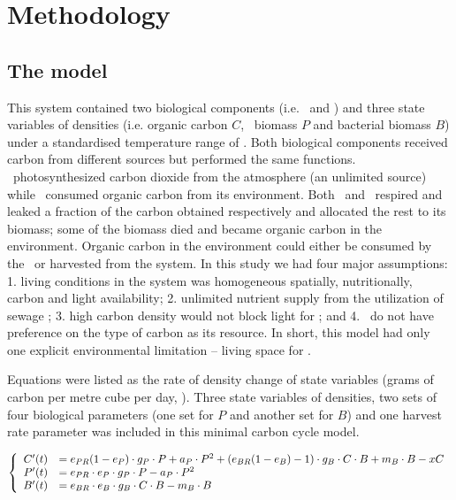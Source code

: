 \documentclass[../thesis.tex]{subfiles} %
\begin{document}
\section{Methodology}

\subsection{The model}

This system contained two biological components (i.e. \phy\ and \bac) and three state variables of densities (i.e. organic carbon $C$, \phy\ biomass $P$ and bacterial biomass $B$) under a standardised temperature range of \temp.  Both biological components received carbon from different sources but performed the same functions. \Phy\ photosynthesized carbon dioxide from the atmosphere (an unlimited source) while \bac\ consumed organic carbon from its environment.  Both \phy\ and \bac\ respired and leaked a fraction of the carbon obtained respectively and allocated the rest to its biomass; some of the biomass died and became organic carbon in the environment.  Organic carbon in the environment could either be consumed by the \bac\ or harvested from the system.  In this study we had four major assumptions: 1. living conditions in the system was homogeneous spatially, nutritionally, carbon and light availability; 2. unlimited nutrient supply from the utilization of sewage \autocite{markou2014microalgal}; 3. high carbon density would not block light for \phy; and 4. \bac\ do not have preference on the type of carbon as its resource.  In short, this model had only one explicit environmental limitation -- living space for \phy.

Equations were listed as the rate of density change of state variables (grams of carbon per metre cube per day, \dxdt).  Three state variables of densities, two sets of four biological parameters (one set for $P$ and another set for $B$) and one harvest rate parameter was included in this minimal carbon cycle model.

\begin{equation}\left\{\begin{array}{rl}
    C'(t) &= e_{PR}(1-e_P)\cdot g_P\cdot P +a_P\cdot P^2 +(e_{BR}(1-e_B)-1)\cdot g_B\cdot C\cdot B +m_B\cdot B -xC\\
    P'(t) &= e_{PR}\cdot e_P\cdot g_P\cdot P -a_P\cdot P^2\\
    B'(t) &= e_{BR}\cdot e_B\cdot g_B\cdot C\cdot B -m_B\cdot B
\end{array}\right.\label{eq:PBH}\end{equation}
\end{document}
